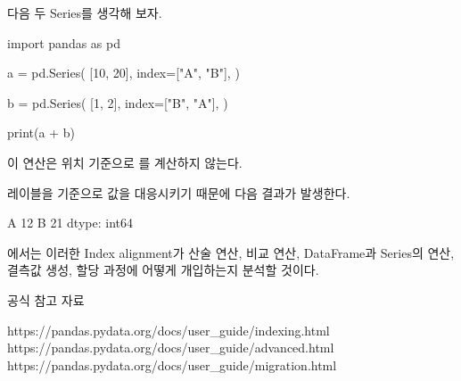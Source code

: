 다음 두 Series를 생각해 보자.

\begin{dhkcode}
import pandas as pd

a = pd.Series(
    [10, 20],
    index=["A", "B"],
)

b = pd.Series(
    [1, 2],
    index=["B", "A"],
)

print(a + b)
\end{dhkcode}

이 연산은 위치 기준으로 \zsh{[11, 22]}를 계산하지 않는다.

레이블을 기준으로 값을 대응시키기 때문에 다음 결과가 발생한다.

\begin{dhkzsh}
A    12
B    21
dtype: int64
\end{dhkzsh}

에서는 이러한 Index alignment가 산술 연산, 비교 연산, DataFrame과 Series의 연산, 결측값 생성, 할당 과정에 어떻게 개입하는지 분석할 것이다.

공식 참고 자료

\begin{dhksmry}
https://pandas.pydata.org/docs/user_guide/indexing.html
https://pandas.pydata.org/docs/user_guide/advanced.html
https://pandas.pydata.org/docs/user_guide/migration.html
\end{dhksmry}
